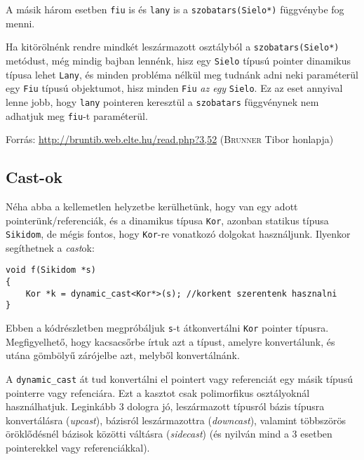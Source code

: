 \documentclass[a4paper,11.5pt,table]{article}
\begin{document}
	A másik három esetben \texttt{fiu} is és \texttt{lany} is a \texttt{szobatars(Sielo*)} függvénybe fog menni.
	
	\medskip
	Ha kitörölnénk rendre mindkét leszármazott osztályból a \texttt{szobatars(Sielo*)} metódust, még mindig bajban lennénk, hisz egy \texttt{Sielo} típusú pointer dinamikus típusa lehet \texttt{Lany}, és minden probléma nélkül meg tudnánk adni neki paraméterül egy \texttt{Fiu} típusú objektumot, hisz minden \texttt{Fiu} \textit{az egy} \texttt{Sielo}.  Ez az eset annyival lenne jobb, hogy \texttt{lany} pointeren keresztül a \texttt{szobatars} függvénynek nem adhatjuk meg \texttt{fiu}-t paraméterül.
	
	\medskip
	Forrás: \url{http://bruntib.web.elte.hu/read.php?3,52} (\textsc{Brunner} Tibor honlapja)
	
	\subsection{Cast-ok}
	
	Néha abba a kellemetlen helyzetbe kerülhetünk, hogy van egy adott pointerünk/referenciák, és a dinamikus típusa \texttt{Kor}, azonban statikus típusa \texttt{Sikidom}, de mégis fontos, hogy \texttt{Kor}-re vonatkozó dolgokat használjunk. Ilyenkor segíthetnek a \textit{cast}ok:
	\begin{lstlisting}
void f(Sikidom *s)
{
	Kor *k = dynamic_cast<Kor*>(s); //korkent szerentenk hasznalni
}
	\end{lstlisting}
	Ebben a kódrészletben megpróbáljuk \texttt{s}-t átkonvertálni \texttt{Kor} pointer típusra. Megfigyelhető, hogy kacsacsőrbe írtuk azt a típust, amelyre konvertálunk, és utána gömbölyű zárójelbe azt, melyből konvertálnánk.
	
	A \texttt{dynamic\_cast} át tud konvertálni el pointert vagy referenciát egy másik típusú pointerre vagy refenciára. Ezt a kasztot csak polimorfikus osztályoknál használhatjuk. Leginkább 3 dologra jó, leszármazott típusról bázis típusra konvertálásra (\textit{upcast}), bázisról leszármazottra (\textit{downcast}), valamint többszörös öröklődésnél bázisok közötti váltásra (\textit{sidecast}) (és nyilván mind a 3 esetben pointerekkel vagy referenciákkal).
	
\end{document}
